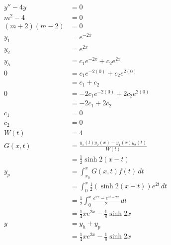 \documentclass{article}
\begin{document}
\begin{align*}
  y'' - 4y        & = 0                                                        \\
  m^2 - 4         & = 0                                                        \\
  (m + 2) (m - 2) & = 0                                                        \\
  y_1             & = e^{-2x}                                                  \\
  y_2             & = e^{2x}                                                   \\
  y_h             & = c_1 e^{-2x} + c_2 e^{2x}                                 \\
  0               & = c_1 e^{-2 (0)} + c_2 e^{2 (0)}                           \\
                  & = c_1 + c_2                                                \\
  0               & = -2 c_1 e^{-2 (0)} + 2 c_2 e^{2 (0)}                      \\
                  & = -2 c_1 + 2 c_2                                           \\
  c_1             & = 0                                                        \\
  c_2             & = 0                                                        \\
  W(t)            & = 4                                                        \\
  G(x, t)         & = \frac{y_1(t) y_2(x) - y_1(x) y_2(t)}{W(t)}               \\
                  & = \frac{1}{2} \sinh 2 (x - t)                              \\
  y_p             & = \int_{x_0}^x G(x, t) f(t) \,dt                           \\
                  & = \int_0^x \frac{1}{2} (\sinh 2 (x - t)) e^{2t} \,dt       \\
                  & = \frac{1}{2} \int_0^x \frac{e^{2x} - e^{4t - 2x}}{2} \,dt \\
                  & = \frac{1}{4} x e^{2x} - \frac{1}{8} \sinh 2x              \\
  y               & = y_h + y_p                                                \\
                  & = \frac{1}{4} x e^{2x} - \frac{1}{8} \sinh 2x
\end{align*}
\end{document}

